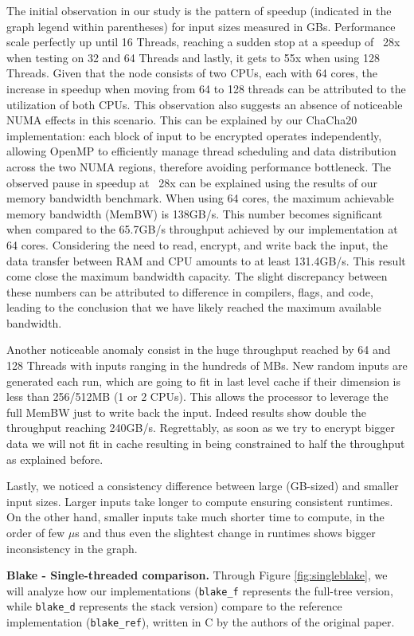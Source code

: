 \documentclass[letterpaper]{article}
\newcommand{\mypar}[1]{{\bf #1.}}
\begin{document}
The initial observation in our study is the pattern of speedup (indicated in the graph legend within parentheses) for input sizes measured in GBs. Performance scale perfectly up until 16 Threads, reaching a sudden stop at a speedup of ~28x when testing on 32 and 64 Threads and lastly, it gets to 55x when using 128 Threads.
Given that the node consists of two CPUs, each with 64 cores, the increase in speedup when moving from 64 to 128 threads can be attributed to the utilization of both CPUs. This observation also suggests an absence of noticeable NUMA effects in this scenario. This can be explained by our ChaCha20 implementation: each block of input to be encrypted operates independently, allowing OpenMP to efficiently manage thread scheduling and data distribution across the two NUMA regions, therefore avoiding performance bottleneck.
The observed pause in speedup at ~28x can be explained using the results of our memory bandwidth benchmark. When using 64 cores, the maximum achievable memory bandwidth (MemBW) is 138GB/s. This number becomes significant when compared to the 65.7GB/s throughput achieved by our implementation at 64 cores. Considering the need to read, encrypt, and write back the input, the data transfer between RAM and CPU amounts to at least 131.4GB/s. This result come close the maximum bandwidth capacity. The slight discrepancy between these numbers can be attributed to difference in compilers, flags, and code, leading to the conclusion that we have likely reached the maximum available bandwidth.

Another noticeable anomaly consist in the huge throughput reached by 64 and 128 Threads with inputs ranging in the hundreds of MBs. New random inputs are generated each run, which are going to fit in last level cache if their dimension is less than 256/512MB (1 or 2 CPUs). This allows the processor to leverage the full MemBW just to write back the input. Indeed results show double the throughput reaching 240GB/s. Regrettably, as soon as we try to encrypt bigger data we will not fit in cache resulting in being constrained to half the throughput as explained before.

Lastly, we noticed a consistency difference between large (GB-sized) and smaller input sizes. Larger inputs take longer to compute ensuring consistent runtimes. On the other hand, smaller inputs take much shorter time to compute, in the order of few $\mu$s and thus even the slightest change in runtimes shows bigger inconsistency in the graph.


\mypar{Blake - Single-threaded comparison}
Through Figure \ref{fig:singleblake}, we will analyze how our implementations (\texttt{blake\_f} represents the full-tree version, while \texttt{blake\_d} represents the stack version) compare to the reference implementation (\texttt{blake\_ref}), written in C by the authors of the original paper.
\end{document}

